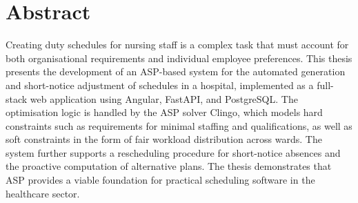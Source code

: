 
\chapter*{Abstract}

Creating duty schedules for nursing staff is a complex task that must account for both organisational requirements and individual employee preferences. This thesis presents the development of an ASP-based system for the automated generation and short-notice adjustment of schedules in a hospital, implemented as a full-stack web application using Angular, FastAPI, and PostgreSQL.
The optimisation logic is handled by the ASP solver Clingo, which models hard constraints such as requirements for minimal staffing and qualifications, as well as soft constraints in the form of fair workload distribution across wards. The system further supports a rescheduling procedure for short-notice absences and the proactive computation of alternative plans. The thesis demonstrates that ASP provides a viable foundation for practical scheduling software in the healthcare sector.